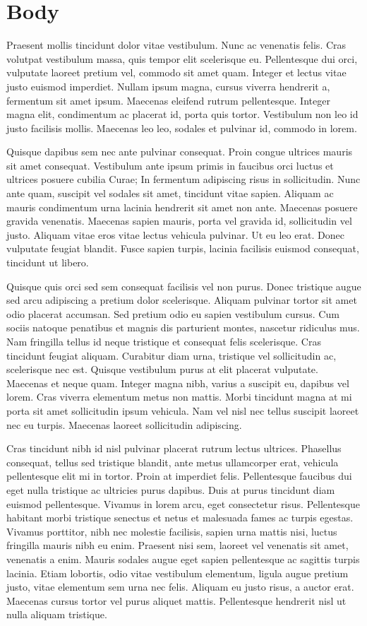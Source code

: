 \documentclass{article}
\begin{document}
\section{Body}
Praesent mollis tincidunt dolor vitae vestibulum. Nunc ac venenatis felis. Cras
volutpat vestibulum massa, quis tempor elit scelerisque eu. Pellentesque dui
orci, vulputate laoreet pretium vel, commodo sit amet quam. Integer et lectus
vitae justo euismod imperdiet. Nullam ipsum magna, cursus viverra hendrerit a,
fermentum sit amet ipsum. Maecenas eleifend rutrum pellentesque. Integer magna
elit, condimentum ac placerat id, porta quis tortor. Vestibulum non leo id justo
facilisis mollis. Maecenas leo leo, sodales et pulvinar id, commodo in lorem.

Quisque dapibus sem nec ante pulvinar consequat. Proin congue ultrices mauris
sit amet consequat. Vestibulum ante ipsum primis in faucibus orci luctus et
ultrices posuere cubilia Curae; In fermentum adipiscing risus in sollicitudin.
Nunc ante quam, suscipit vel sodales sit amet, tincidunt vitae sapien. Aliquam
ac mauris condimentum urna lacinia hendrerit sit amet non ante. Maecenas posuere
gravida venenatis. Maecenas sapien mauris, porta vel gravida id, sollicitudin
vel justo. Aliquam vitae eros vitae lectus vehicula pulvinar. Ut eu leo erat.
Donec vulputate feugiat blandit. Fusce sapien turpis, lacinia facilisis euismod
consequat, tincidunt ut libero.

Quisque quis orci sed sem consequat facilisis vel non purus. Donec tristique
augue sed arcu adipiscing a pretium dolor scelerisque. Aliquam pulvinar tortor
sit amet odio placerat accumsan. Sed pretium odio eu sapien vestibulum cursus.
Cum sociis natoque penatibus et magnis dis parturient montes, nascetur ridiculus
mus. Nam fringilla tellus id neque tristique et consequat felis scelerisque.
Cras tincidunt feugiat aliquam. Curabitur diam urna, tristique vel sollicitudin
ac, scelerisque nec est. Quisque vestibulum purus at elit placerat vulputate.
Maecenas et neque quam. Integer magna nibh, varius a suscipit eu, dapibus vel
lorem. Cras viverra elementum metus non mattis. Morbi tincidunt magna at mi
porta sit amet sollicitudin ipsum vehicula. Nam vel nisl nec tellus suscipit
laoreet nec eu turpis. Maecenas laoreet sollicitudin adipiscing.

Cras tincidunt nibh id nisl pulvinar placerat rutrum lectus ultrices. Phasellus
consequat, tellus sed tristique blandit, ante metus ullamcorper erat, vehicula
pellentesque elit mi in tortor. Proin at imperdiet felis. Pellentesque faucibus
dui eget nulla tristique ac ultricies purus dapibus. Duis at purus tincidunt
diam euismod pellentesque. Vivamus in lorem arcu, eget consectetur risus.
Pellentesque habitant morbi tristique senectus et netus et malesuada fames ac
turpis egestas. Vivamus porttitor, nibh nec molestie facilisis, sapien urna
mattis nisi, luctus fringilla mauris nibh eu enim. Praesent nisi sem, laoreet
vel venenatis sit amet, venenatis a enim. Mauris sodales augue eget sapien
pellentesque ac sagittis turpis lacinia. Etiam lobortis, odio vitae vestibulum
elementum, ligula augue pretium justo, vitae elementum sem urna nec felis.
Aliquam eu justo risus, a auctor erat. Maecenas cursus tortor vel purus aliquet
mattis. Pellentesque hendrerit nisl ut nulla aliquam tristique.
\end{document}

